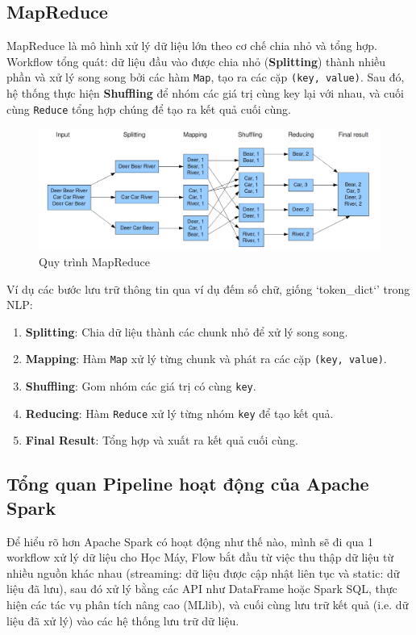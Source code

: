 \documentclass[11pt]{article}
\begin{document}
\subsection{MapReduce}
MapReduce là mô hình xử lý dữ liệu lớn theo cơ chế chia nhỏ và tổng hợp. Workflow tổng quát: dữ liệu đầu vào được chia nhỏ (\textbf{Splitting}) thành nhiều phần và xử lý song song bởi các hàm \texttt{Map}, tạo ra các cặp \texttt{(key, value)}. Sau đó, hệ thống thực hiện \textbf{Shuffling} để nhóm các giá trị cùng key lại với nhau, và cuối cùng \texttt{Reduce} tổng hợp chúng để tạo ra kết quả cuối cùng.
\begin{figure}[H]
    \centering
    \includegraphics[width=0.9\linewidth]{mapReduce.png}
    \caption{Quy trình MapReduce}
    \label{fig:mapreduce-flow}
\end{figure}

\noindent Ví dụ các bước lưu trữ thông tin qua ví dụ đếm số chữ, giống `token\_dict`' trong NLP:
\begin{enumerate}
    \item \textbf{Splitting}: Chia dữ liệu thành các chunk nhỏ để xử lý song song.
    \item \textbf{Mapping}: Hàm \texttt{Map} xử lý từng chunk và phát ra các cặp \texttt{(key, value)}.
    \item \textbf{Shuffling}: Gom nhóm các giá trị có cùng \texttt{key}.
    \item \textbf{Reducing}: Hàm \texttt{Reduce} xử lý từng nhóm \texttt{key} để tạo kết quả.
    \item \textbf{Final Result}: Tổng hợp và xuất ra kết quả cuối cùng.
\end{enumerate}



\subsection{Tổng quan Pipeline hoạt động của Apache Spark}
Để hiểu rõ hơn Apache Spark có hoạt động như thế nào, mình sẽ đi qua 1 workflow xử lý dữ liệu cho Học Máy,
Flow bắt đầu từ việc thu thập dữ liệu từ nhiều nguồn khác nhau (streaming: dữ liệu được cập nhật liên tục và static: dữ liệu đã lưu),
sau đó xử lý bằng các API như DataFrame hoặc Spark SQL, thực hiện các tác vụ phân tích nâng cao (MLlib),
và cuối cùng lưu trữ kết quả (i.e. dữ liệu đã xử lý) vào các hệ thống lưu trữ dữ liệu.
\end{document}
